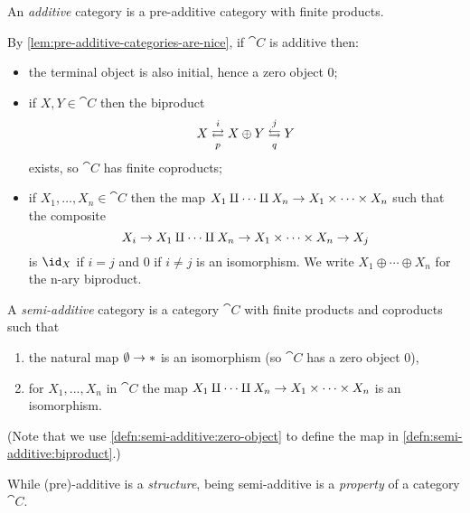 \documentclass[../main.tex]{subfiles}
\begin{document}
\begin{defn}
  An \emph{additive} category is a pre-additive category with finite products.
\end{defn}
\begin{rmk}
  By \cref{lem:pre-additive-categories-are-nice}, if $\cat C$ is additive then:
  \begin{itemize}
      \item the terminal object is also initial, hence a zero object $0$;
    \item if $X, Y \in \cat C$ then the biproduct \[X \xrightleftarrows{i}[p] X \oplus Y \xleftrightarrows{j}[q] Y\] exists, so $\cat C$ has finite coproducts;
    \item if $X_1, \ldots, X_n \in \cat C$ then the map $X_1 \amalg \cdots \amalg X_n \to X_1 \times \cdots \times X_n$ such that the composite
                  \[ X_i \to X_1 \amalg \cdots \amalg X_n \to X_1 \times \cdots \times X_n \to X_j \]
                is $\id_X$ if $i = j$ and $0$ if $i \neq j$ is an isomorphism. We write $X_1 \oplus \cdots \oplus X_n$ for the n-ary biproduct.
    \end{itemize}

\end{rmk}

\begin{defn}\label{defn:semi-additive}
A \emph{semi-additive} category is a category $\cat C$ with finite products and coproducts such that
\begin{enumerate}
\item\label{defn:semi-additive:zero-object} the natural map $\emptyset \to {\mathord{*}}$ is an isomorphism (so $\cat C$ has a zero object $0$),
\item\label{defn:semi-additive:biproduct} for $X_1, ..., X_n$ in $\cat C$ the map $X_1 \amalg \cdots \amalg X_n \to X_1 \times \cdots \times X_n$ is an isomorphism.
\end{enumerate}
(Note that we use \cref{defn:semi-additive:zero-object} to define the map in \cref{defn:semi-additive:biproduct}.)
\end{defn}

\begin{rmk}
While (pre)-additive is a \emph{structure}, being semi-additive is a \emph{property} of a category $\cat C$.
\end{rmk}
\end{document}
